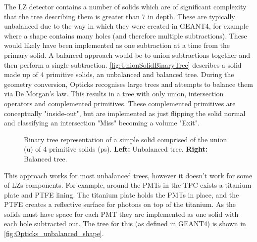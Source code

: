 \par
The LZ detector contains a number of solids which are of significant complexity that the tree describing them is greater than 7 in depth.
These are typically unbalanced due to the way in which they were created in GEANT4, for example where a shape contains many holes (and therefore multiple subtractions).
These would likely have been implemented as one subtraction at a time from the primary solid.
A balanced approach would be to union subtractions together and then perform a single subtraction.
\autoref{fig:UnionSolidBinaryTree} describes a solid made up of 4 primitive solids, an unbalanced and balanced tree.
During the geometry conversion, Opticks recognises large trees and attempts to balance them via De Morgan's law.
This results in a tree with only union, intersection operators and complemented primitives.
These complemented primitives are conceptually "inside-out", but are implemented as just flipping the solid normal and classifying an intersection "Miss" becoming a volume "Exit".
\begin{figure}
\centering 
{}
\caption{Binary tree representation of a simple solid comprised of the union (u) of 4 primitive solids (ps). \textbf{Left:} Unbalanced tree. \textbf{Right:} Balanced tree.}
\label{fig:UnionSolidBinaryTree}
\end{figure}
\par
This approach works for most unbalanced trees, however it doesn't work for some of LZs components.
For example, around the PMTs in the TPC exists a titanium plate and PTFE lining.
The titanium plate holds the PMTs in place, and the PTFE creates a reflective surface for photons on top of the titanium.
As the solids must have space for each PMT they are implemented as one solid with each hole subtracted out.
The tree for this (as defined in GEANT4) is shown in \autoref{fig:Opticks_unbalanced_shape}.
